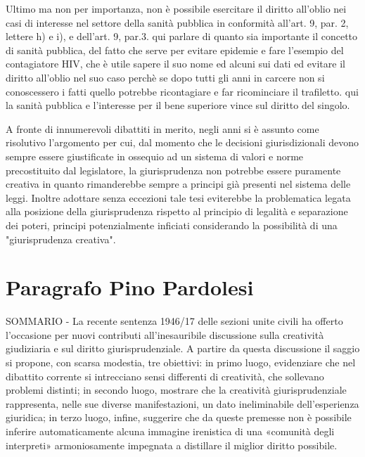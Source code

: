 Ultimo ma non per importanza, non è possibile esercitare il diritto all'oblio nei casi di interesse nel settore della sanità pubblica in conformità all'art. 9, par. 2, lettere h) e i), e dell'art. 9, par.3.
qui parlare di quanto sia importante il concetto di sanità pubblica, del fatto che serve per evitare epidemie e fare l'esempio del contagiatore HIV, che è utile sapere il suo nome ed alcuni sui dati ed evitare il diritto all'oblio nel suo caso perchè se dopo tutti gli anni in carcere non si conoscessero i fatti quello potrebbe ricontagiare e far ricominciare il trafiletto. qui la sanità pubblica e l'interesse per il bene superiore vince sul diritto del singolo.

A fronte di innumerevoli dibattiti in merito, negli anni si è assunto come risolutivo l’argomento per cui, dal momento che le decisioni giurisdizionali devono sempre essere giustificate in ossequio ad un sistema di valori e norme precostituito dal legislatore, la giurisprudenza non potrebbe essere puramente creativa in quanto rimanderebbe sempre a principi già presenti nel sistema delle leggi. Inoltre adottare senza eccezioni tale tesi eviterebbe la problematica legata alla posizione della giurisprudenza rispetto al principio di legalità e separazione dei poteri, principi potenzialmente inficiati considerando la possibilità di una "giurisprudenza creativa".

\section{Paragrafo Pino Pardolesi}

SOMMARIO - La recente sentenza 1946/17 delle sezioni unite  civili  ha offerto  l’occasione  per  nuovi  contributi  all’inesauribile  discussione  sulla creatività  giudiziaria  e  sul  diritto  giurisprudenziale.  A  partire  da  questa  discussione  il saggio si propone, con scarsa modestia, tre obiettivi: in primo luogo, evidenziare che nel dibattito corrente si intrecciano  sensi  differenti  di  creatività,  che  sollevano  problemi  distinti;  in  secondo  luogo,  mostrare  che  la  creatività  giurisprudenziale rappresenta, nelle sue diverse manifestazioni, un dato  ineliminabile  dell’esperienza  giuridica;  in  terzo  luogo, infine,  suggerire  che  da  queste  premesse  non  è  possibile  inferire  automaticamente  alcuna  immagine  irenistica  di  una 
«comunità degli interpreti» armoniosamente impegnata a distillare il miglior diritto possibile. 

